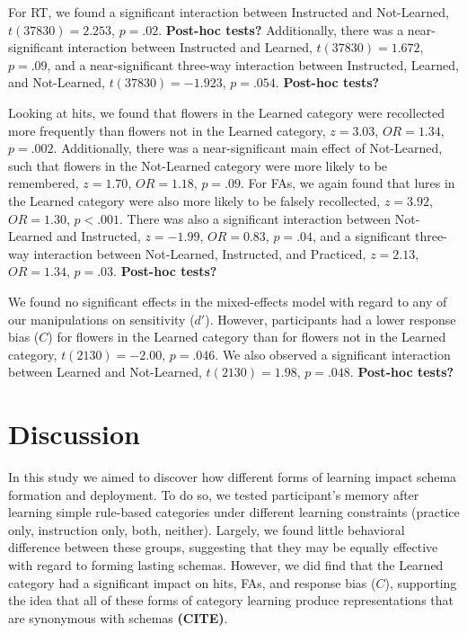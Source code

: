 \documentclass[twocolumn]{svjour3}          %
\begin{document}
For RT, we found a significant interaction between Instructed and
Not-Learned, $t(37830) = 2.253$, $p = .02$. \textbf{Post-hoc tests?}
Additionally, there was a near-significant interaction between
Instructed and Learned, $t(37830) = 1.672$, $p = .09$, and a
near-significant three-way interaction between Instructed, Learned,
and Not-Learned, $t(37830) = -1.923$, $p = .054$. \textbf{Post-hoc
  tests?}

Looking at hits, we found that flowers in the Learned category were
recollected more frequently than flowers not in the Learned category,
$z = 3.03$, $OR = 1.34$, $p = .002$. Additionally, there was a
near-significant main effect of Not-Learned, such that flowers in the
Not-Learned category were more likely to be remembered, $z = 1.70$,
$OR = 1.18$, $p = .09$. For FAs, we again found that lures in the
Learned category were also more likely to be falsely recollected, $z =
3.92$, $OR = 1.30$, $p < .001$. There was also a significant
interaction between Not-Learned and Instructed, $z = -1.99$, $OR =
0.83$, $p = .04$, and a significant three-way interaction between
Not-Learned, Instructed, and Practiced, $z = 2.13$, $OR = 1.34$, $p =
.03$. \textbf{Post-hoc tests?}

We found no significant effects in the mixed-effects model with regard
to any of our manipulations on sensitivity ($d'$). However,
participants had a lower response bias ($C$) for flowers in the
Learned category than for flowers not in the Learned category,
$t(2130) = -2.00$, $p = .046$. We also observed a significant
interaction between Learned and Not-Learned, $t(2130) = 1.98$, $p =
.048$. \textbf{Post-hoc tests?}

\section*{Discussion}
\label{discussion}
In this study we aimed to discover how different forms of learning
impact schema formation and deployment. To do so, we tested
participant's memory after learning simple rule-based categories under
different learning constraints (practice only, instruction only, both,
neither). Largely, we found little behavioral difference between these
groups, suggesting that they may be equally effective with regard to
forming lasting schemas. However, we did find that the Learned
category had a significant impact on hits, FAs, and response bias
($C$), supporting the idea that all of these forms of category
learning produce representations that are synonymous with schemas
\textbf{(CITE)}.
\end{document}
